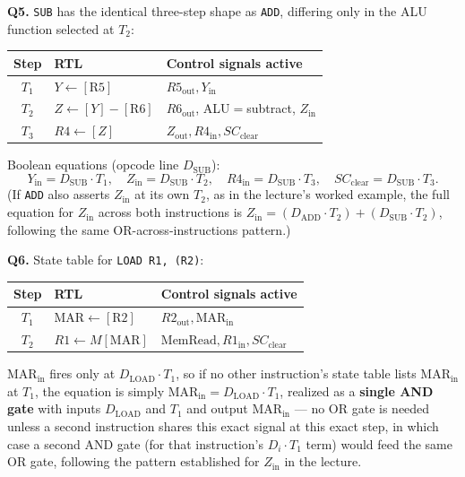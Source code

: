\documentclass[11pt]{article}
\begin{document}
\textbf{Q5.} \texttt{SUB} has the identical three-step shape as \texttt{ADD}, differing only in the ALU function selected at $T_2$:

\begin{center}
\small
\begin{tabular}{@{}cll@{}}
\toprule
\textbf{Step} & \textbf{RTL} & \textbf{Control signals active} \\
\midrule
$T_1$ & $Y \gets [\text{R5}]$ & $R5_{\text{out}}, Y_{\text{in}}$ \\
$T_2$ & $Z \gets [Y] - [\text{R6}]$ & $R6_{\text{out}}$, ALU$=$subtract, $Z_{\text{in}}$ \\
$T_3$ & $R4 \gets [Z]$ & $Z_{\text{out}}, R4_{\text{in}}, SC_{\text{clear}}$ \\
\bottomrule
\end{tabular}
\end{center}

Boolean equations (opcode line $D_{\text{SUB}}$):
\[
Y_{\text{in}} = D_{\text{SUB}} \cdot T_1, \quad
Z_{\text{in}} = D_{\text{SUB}} \cdot T_2, \quad
R4_{\text{in}} = D_{\text{SUB}} \cdot T_3, \quad
SC_{\text{clear}} = D_{\text{SUB}} \cdot T_3.
\]
(If \texttt{ADD} also asserts $Z_{\text{in}}$ at its own $T_2$, as in the lecture's worked example, the full equation for $Z_{\text{in}}$ across both instructions is $Z_{\text{in}} = (D_{\text{ADD}} \cdot T_2) + (D_{\text{SUB}} \cdot T_2)$, following the same OR-across-instructions pattern.)

\textbf{Q6.} State table for \texttt{LOAD R1, (R2)}:
\begin{center}
\small
\begin{tabular}{@{}cll@{}}
\toprule
\textbf{Step} & \textbf{RTL} & \textbf{Control signals active} \\
\midrule
$T_1$ & $\text{MAR} \gets [\text{R2}]$ & $R2_{\text{out}}, \text{MAR}_{\text{in}}$ \\
$T_2$ & $R1 \gets M[\text{MAR}]$ & $\text{MemRead}, R1_{\text{in}}, SC_{\text{clear}}$ \\
\bottomrule
\end{tabular}
\end{center}
$\text{MAR}_{\text{in}}$ fires only at $D_{\text{LOAD}} \cdot T_1$, so if no other instruction's state table lists $\text{MAR}_{\text{in}}$ at $T_1$, the equation is simply $\text{MAR}_{\text{in}} = D_{\text{LOAD}} \cdot T_1$, realized as a \textbf{single AND gate} with inputs $D_{\text{LOAD}}$ and $T_1$ and output $\text{MAR}_{\text{in}}$ --- no OR gate is needed unless a second instruction shares this exact signal at this exact step, in which case a second AND gate (for that instruction's $D_i \cdot T_1$ term) would feed the same OR gate, following the pattern established for $Z_{\text{in}}$ in the lecture.
\end{document}
